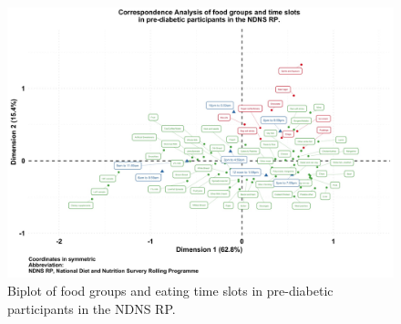 \documentclass[utf8]{frontiersSCNS}
\begin{document}
\begin{landscape}
\begin{figure}[!ht]
\begin{center}
\includegraphics[width=21.5cm]{Fig5.jpg}
\end{center}
\caption{Biplot of food groups and eating time slots in pre-diabetic participants in the NDNS RP.}\label{fig:fig5}
\end{figure}

\end{landscape}
\end{document}
